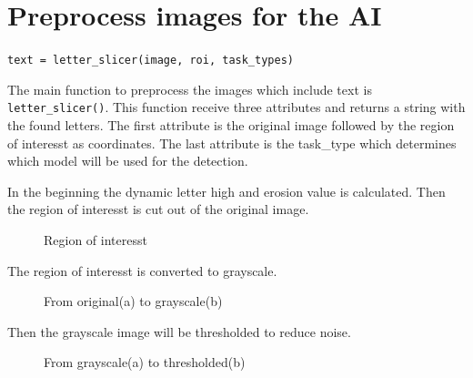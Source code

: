\author{Florian Müller}
\section {Preprocess images for the AI}

\texttt{text = letter\_slicer(image, roi, task\_types)}

The main function to preprocess the images which include text is \texttt{letter\_slicer()}.
This function receive three attributes and returns a string with the found letters.
The first attribute is the original image followed by the region of interesst as coordinates.
The last attribute is the task\_type which determines which model will be used for the detection.

In the beginning the dynamic letter high and erosion value is calculated.
Then the region of interesst is cut out of the original image.

\begin{figure}[H]
    \centering
    \caption{Region of interesst}
\end{figure}

The region of interesst is converted to grayscale.

\begin{figure}[H]
    \centering
    \qquad
    \caption{From original(a) to grayscale(b)}
\end{figure}

Then the grayscale image will be thresholded to reduce noise.

\begin{figure}[H]
    \centering
    \qquad
    \caption{From grayscale(a) to thresholded(b)}
\end{figure}

